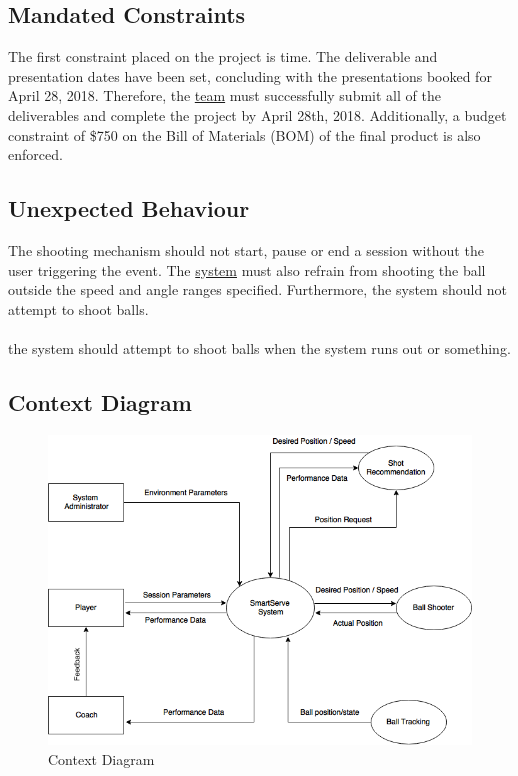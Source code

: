 \documentclass[11pt]{article}
\begin{document}
\subsection{Mandated Constraints}
The first constraint placed on the project is time. The deliverable and presentation dates have been set, concluding with the presentations booked for April 28, 2018. Therefore, the \hyperref[sec:definitions]{team} must successfully submit all of the deliverables and complete the project by April 28th, 2018. Additionally, a budget constraint of \$750 on the Bill of Materials (BOM) of the final product is also enforced.
\subsection{Unexpected Behaviour} 
The shooting mechanism should not start, pause or end a session without the user triggering the event. The \hyperref[sec:definitions]{system} must also refrain from shooting the ball outside the speed and angle ranges specified. Furthermore, the system should not attempt to shoot balls. \\\\
the system should attempt to shoot balls when the system runs out or something.



\subsection{Context Diagram}
\begin{figure}[H]
   \centering
   \includegraphics[width=\textwidth]{diagrams/ContextDiagram.png}
   \caption{Context Diagram}
   \label{fig:ContextDiagram}
\end{figure}
\end{document}
